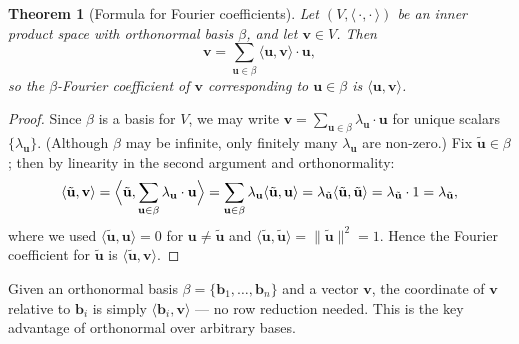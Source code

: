 \documentclass[11pt, a4paper, notitlepage]{report}
\newtheorem{theorem}{Theorem}[section]
\theoremstyle{definition}
\theoremstyle{remark}
\begin{document}
\begin{theorem}[Formula for Fourier coefficients]
\label{thm:fourier-formula}
Let $(V,\langle\,\cdot,\cdot\,\rangle)$ be an inner product space with orthonormal basis $\beta$,
and let $\mathbf{v}\in V$.
Then
\[
  \mathbf{v} = \sum_{\mathbf{u}\in\beta}\langle\mathbf{u},\mathbf{v}\rangle\cdot\mathbf{u},
\]
so the $\beta$-Fourier coefficient of $\mathbf{v}$ corresponding to $\mathbf{u}\in\beta$ is
$\langle\mathbf{u},\mathbf{v}\rangle$.
\end{theorem}

\begin{proof}
Since $\beta$ is a basis for $V$, we may write $\mathbf{v} = \sum_{\mathbf{u}\in\beta}\lambda_{\mathbf{u}}\cdot\mathbf{u}$
for unique scalars $\{\lambda_{\mathbf{u}}\}$.
(Although $\beta$ may be infinite, only finitely many $\lambda_{\mathbf{u}}$ are non-zero.)
Fix $\tilde{\mathbf{u}}\in\beta$; then by linearity in the second argument and orthonormality:
\[
  \langle\tilde{\mathbf{u}},\mathbf{v}\rangle
  = \Bigl\langle\tilde{\mathbf{u}},\sum_{\mathbf{u}\in\beta}\lambda_{\mathbf{u}}\cdot\mathbf{u}\Bigr\rangle
  = \sum_{\mathbf{u}\in\beta}\lambda_{\mathbf{u}}\langle\tilde{\mathbf{u}},\mathbf{u}\rangle
  = \lambda_{\tilde{\mathbf{u}}}\langle\tilde{\mathbf{u}},\tilde{\mathbf{u}}\rangle
  = \lambda_{\tilde{\mathbf{u}}}\cdot 1
  = \lambda_{\tilde{\mathbf{u}}},
\]
where we used $\langle\tilde{\mathbf{u}},\mathbf{u}\rangle = 0$ for $\mathbf{u}\neq\tilde{\mathbf{u}}$
and $\langle\tilde{\mathbf{u}},\tilde{\mathbf{u}}\rangle = \|\tilde{\mathbf{u}}\|^2 = 1$.
Hence the Fourier coefficient for $\tilde{\mathbf{u}}$ is $\langle\tilde{\mathbf{u}},\mathbf{v}\rangle$.
\end{proof}

\begin{examtip}[title={Exam Tip: Computing Fourier Coefficients}]
Given an orthonormal basis $\beta = \{\mathbf{b}_1,\ldots,\mathbf{b}_n\}$ and a vector
$\mathbf{v}$, the coordinate of $\mathbf{v}$ relative to $\mathbf{b}_i$ is simply
$\langle\mathbf{b}_i,\mathbf{v}\rangle$ — no row reduction needed.
This is the key advantage of orthonormal over arbitrary bases.
\end{examtip}
\end{document}
